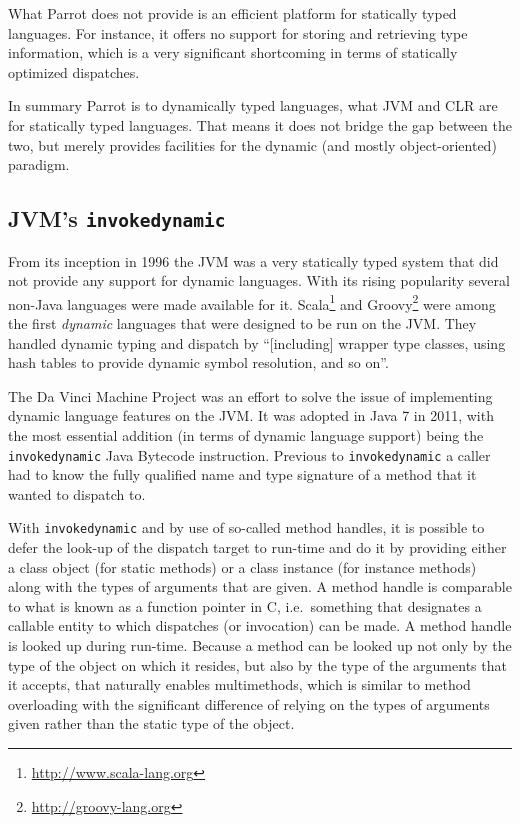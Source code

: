 What Parrot does not provide is an efficient platform for statically typed
languages. For instance, it offers no support for storing and retrieving type
information, which is a very significant shortcoming in terms of statically
optimized dispatches.

In summary Parrot is to dynamically typed languages, what JVM and CLR are for
statically typed languages. That means it does not bridge the gap between the
two, but merely provides facilities for the dynamic (and mostly object-oriented)
paradigm.

\subsection{JVM's \texttt{invokedynamic}}
\label{sec:related-work:jvm}

From its inception in 1996\cite{java-1.0-press} the JVM was a very statically
typed system that did not provide any support for dynamic languages. With its
rising popularity several non-Java languages were made available for
it. Scala\footnote{\url{http://www.scala-lang.org}} and
Groovy\footnote{\url{http://groovy-lang.org}} were among the first
\textit{dynamic} languages that were designed to be run on the JVM. They handled
dynamic typing and dispatch by ``[including] wrapper type classes, using hash
tables to provide dynamic symbol resolution, and so on''\cite{friesen14}.

The Da Vinci Machine Project\cite{da-vinci} was an effort to solve the issue of
implementing dynamic language features on the JVM. It was adopted in Java 7 in
2011, with the most essential addition (in terms of dynamic language support)
being the \texttt{invokedynamic} Java Bytecode instruction. Previous to
\texttt{invokedynamic} a caller had to know the fully qualified name and type
signature of a method that it wanted to dispatch to.

With \texttt{invokedynamic} and by use of so-called method handles, it is
possible to defer the look-up of the dispatch target to run-time and do it by
providing either a class object (for static methods) or a class instance (for
instance methods) along with the types of arguments that are given. A method
handle is comparable to what is known as a function pointer in
C\cite{friesen14}, i.e.\ something that designates a callable entity to which
dispatches (or invocation) can be made. A method handle is looked up during
run-time. Because a method can be looked up not only by the type of the object
on which it resides, but also by the type of the arguments that it accepts, that
naturally enables multimethods, which is similar to method overloading with the
significant difference of relying on the types of arguments given rather than
the static type of the object.


